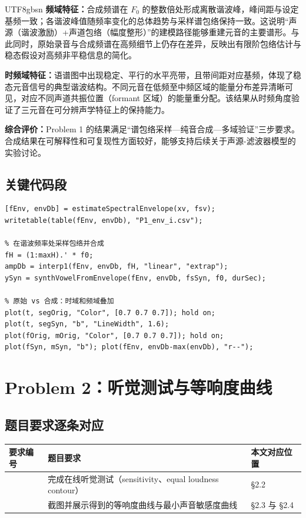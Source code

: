 \documentclass[12pt,a4paper]{article}
\begin{document}
\begin{CJK*}{UTF8}{gbsn}
\textbf{频域特征：}合成频谱在 \(F_0\) 的整数倍处形成离散谐波峰，峰间距与设定基频一致；各谐波峰值随频率变化的总体趋势与采样谱包络保持一致。这说明“声源（谐波激励）+声道包络（幅度整形）”的建模路径能够重建元音的主要谱形。与此同时，原始录音与合成频谱在高频细节上仍存在差异，反映出有限阶包络估计与稳态假设对高频非平稳信息的简化。

\textbf{时频域特征：}语谱图中出现稳定、平行的水平亮带，且带间距对应基频，体现了稳态元音信号的典型谐波结构。不同元音在低频至中频区域的能量分布差异清晰可见，对应不同声道共振位置（formant 区域）的能量重分配。该结果从时频角度验证了三元音在可分辨声学特征上的保持能力。

\textbf{综合评价：}Problem 1 的结果满足“谱包络采样—纯音合成—多域验证”三步要求。合成结果在可解释性和可复现性方面较好，能够支持后续关于声源-滤波器模型的实验讨论。

\subsection{关键代码段}
\begin{lstlisting}[caption={Problem 1 谱包络采样、谐波加权与对比绘图}]
% 提取稳态段并估计连续谱包络（dB）
[fEnv, envDb] = estimateSpectralEnvelope(xv, fsv);
writetable(table(fEnv, envDb), "P1_env_i.csv");

% 在谐波频率处采样包络并合成
fH = (1:maxH).' * f0;
ampDb = interp1(fEnv, envDb, fH, "linear", "extrap");
ySyn = synthVowelFromEnvelope(fEnv, envDb, fsSyn, f0, durSec);

% 原始 vs 合成：时域和频域叠加
plot(t, segOrig, "Color", [0.7 0.7 0.7]); hold on;
plot(t, segSyn, "b", "LineWidth", 1.6);
plot(fOrig, mOrig, "Color", [0.7 0.7 0.7]); hold on;
plot(fSyn, mSyn, "b"); plot(fEnv, envDb-max(envDb), "r--");
\end{lstlisting}

\section{Problem 2：听觉测试与等响度曲线}

\subsection{题目要求逐条对应}
\begin{table}[H]
\centering
\begin{tabular}{>{\centering\arraybackslash}p{1.3cm}p{9.8cm}p{3.2cm}}
\toprule
要求编号 & 题目要求 & 本文对应位置 \\
\midrule
1 & 完成在线听觉测试（sensitivity、equal loudness contour） & \S2.2 \\
2 & 截图并展示得到的等响度曲线与最小声音敏感度曲线 & \S2.3 与 \S2.4 \\
\bottomrule
\end{tabular}
\end{table}


\end{CJK*}
\end{document}
